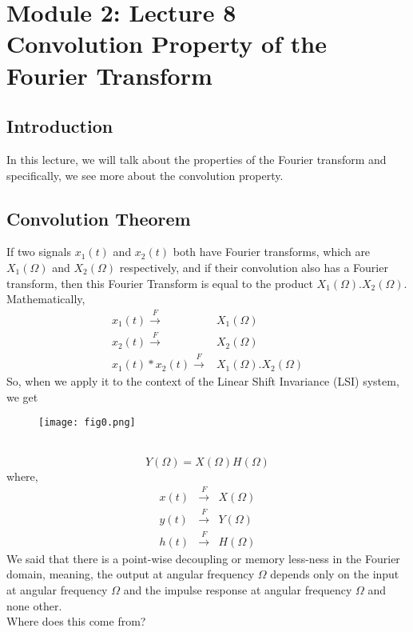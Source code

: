 \section{Module 2: Lecture 8\\Convolution Property of the Fourier Transform}

\subsection{Introduction}
In this lecture, we will talk about the properties of the Fourier transform and specifically, we see more about the convolution property.
\subsection{Convolution Theorem}
If two signals $x_1(t)$ and $x_2(t)$ both have Fourier transforms, which are $X_1(\Omega)$ and $X_2(\Omega)$ respectively, and if their convolution also has a Fourier transform, then this Fourier Transform is equal to the product $X_1(\Omega). X_2(\Omega)$.\\
Mathematically,
\begin{eqnarray}
x_1(t)\xrightarrow{F}& X_1(\Omega)\\
x_2(t)\xrightarrow{F}& X_2(\Omega)\\
x_1(t)*x_2(t)\xrightarrow{F}& X_1(\Omega).X_2(\Omega)
\end{eqnarray}
So, when we apply it to the context of the Linear Shift Invariance (LSI) system, we get
\begin{figure}[ht]
\centering
\texttt{[image: fig0.png]}
\end{figure}
\\
\begin{equation}
Y(\Omega)=X(\Omega)H(\Omega)
\end{equation}
where,
\begin{eqnarray}
x(t) &\xrightarrow{F}& X(\Omega)\\
y(t) &\xrightarrow{F}& Y(\Omega)\\
h(t) &\xrightarrow{F}& H(\Omega)
\end{eqnarray}
We said that there is a point-wise decoupling or memory less-ness in the Fourier domain, meaning, the output at angular frequency $\Omega$ depends only on the input at angular frequency $\Omega$ and the impulse response at angular frequency $\Omega$ and none other.\\
Where does this come from?\\
